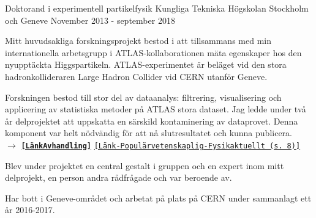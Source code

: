 


\begin{cventries}


\cventry
{Doktorand i experimentell partikelfysik} %
{Kungliga Tekniska Högskolan} %
{Stockholm och Geneve} %
{November 2013 - september 2018} %
{ %
\begin{cvitems}
\item {Mitt huvudsakliga forskningsprojekt bestod i att tillsammans med min internationella arbetsgrupp i ATLAS-kollaborationen mäta egenskaper hos den nyupptäckta Higgspartikeln. ATLAS-experimentet är beläget vid den stora hadronkollideraren Large Hadron Collider vid CERN utanför Geneve.
\item Forskningen bestod till stor del av dataanalys: filtrering, visualisering och applicering av statistiska metoder på ATLAS stora dataset. Jag ledde under två år delprojektet att uppskatta en särskild kontaminering av dataprovet. Denna komponent var helt nödvändig för att nå slutresultatet och kunna publicera. \\ 
$\rightarrow$  \href{http://kth.diva-portal.org/smash/record.jsf?pid=diva2\%3A1244395\&dswid=7018}{{\bf \texttt{[LänkAvhandling]}}} \href{http://www.fysikersamfundet.se/wp-content/uploads/Fysikaktuellt3-18_Webb.pdf}{\texttt{[Länk-Populärvetenskaplig-Fysikaktuellt (s. 8)]}} }
\item Blev under projektet en central gestalt i gruppen och en expert inom mitt delprojekt, en person andra rådfrågade och var beroende av.
\item {Har bott i Geneve-området och arbetat på plats på CERN under sammanlagt ett år 2016-2017.} %

\end{cvitems}}
\end{cventries}
